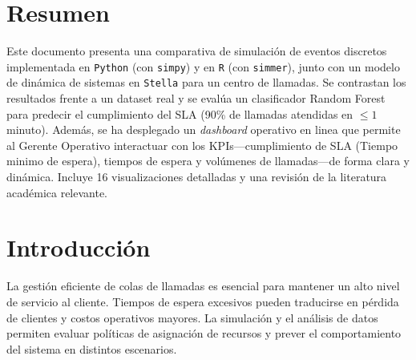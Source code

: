 \documentclass[12pt]{article}
\begin{document}
\section*{Resumen}
Este documento presenta una comparativa de simulación de eventos discretos implementada en \texttt{Python} (con \texttt{simpy}) y en \texttt{R} (con \texttt{simmer}), junto con un modelo de dinámica de sistemas en \texttt{Stella} para un centro de llamadas. Se contrastan los resultados frente a un dataset real y se evalúa un clasificador Random Forest para predecir el cumplimiento del SLA (90\% de llamadas atendidas en $\le1$ minuto). Además, se ha desplegado un \emph{dashboard} operativo en linea 
que permite al Gerente Operativo interactuar con los KPIs—cumplimiento de SLA (Tiempo minimo de espera), tiempos de espera y volúmenes de llamadas—de forma clara y dinámica. Incluye 16 visualizaciones detalladas y una revisión de la literatura académica relevante.

\newpage
\section{Introducción}
La gestión eficiente de colas de llamadas es esencial para mantener un alto nivel de servicio al cliente. Tiempos de espera excesivos pueden traducirse en pérdida de clientes y costos operativos mayores. La simulación y el análisis de datos permiten evaluar políticas de asignación de recursos y prever el comportamiento del sistema en distintos escenarios.

\end{document}
